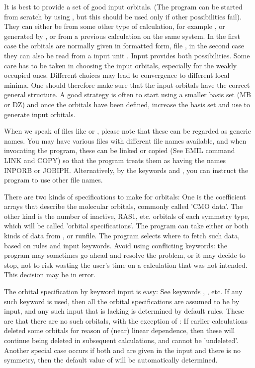 It is best to provide a set of good input orbitals.
(The program can be started from scratch by using ,
but this should be used only if other possibilities fail).
They can either be from some
other type of calculation, for example , or generated by
, or from a previous
 calculation on the same system. In the first case the
orbitals are normally given in formatted form, file , in the
second case they can also be read from a  input unit
.
Input provides both possibilities. Some care has to be taken in choosing the
input orbitals, especially for the weakly occupied ones. Different choices
may lead to convergence to different local minima. One should therefore make
sure that the input orbitals have the correct general structure. A good strategy
is often to start using a smaller basis set (MB or DZ) and once the orbitals
have been defined, increase the basis set and use  to generate
input orbitals.

When we speak of files like   or , please note that
these can be regarded as generic names. You may have various files with different
file names available, and when invocating the  program, these
can be linked or copied (See EMIL command LINK and COPY) so that the program
treats them as having the names INPORB or JOBIPH. Alternatively, by the keywords
 and  , you can instruct the program to use
other file names.

There are two kinds of specifications to make for orbitals: One is the coefficient
arrays that describe the molecular orbitals, commonly called 'CMO data'. The other
kind is the number of inactive, RAS1, etc. orbitals of each symmetry type, which
will be called 'orbital specifications'. The
program can take either or both kinds of data from , 
or runfile. The program selects where to fetch such data, based on rules and
input keywords. Avoid using conflicting keywords: the program may sometimes go
ahead and resolve the problem, or it may decide to stop, not to risk wasting
the user's time on a calculation that was not intended. This decision may be
in error.

The orbital specification by keyword input is easy: See keywords ,
, etc. If any such keyword is used, then all the orbital
specifications are assumed to be by input, and any such input that is lacking
is determined by default rules. These are
that there are no such orbitals, with the exception of
: If earlier calculations deleted some orbitals for reason of
(near) linear dependence, then these will continue being deleted in subsequent
calculations, and cannot be 'undeleted'. Another special case occurs if both
 and  are given in the input and there is no
symmetry, then the default value of  will be automatically
determined.

